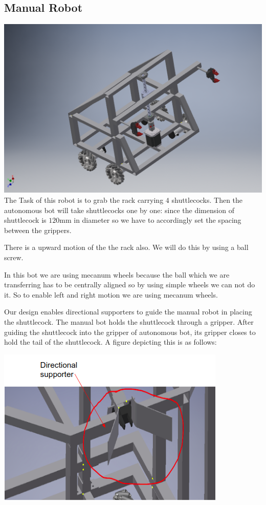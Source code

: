 \documentclass[11pt]{article}
\begin{document}
\subsection{Manual Robot}
	\includegraphics[scale=0.4]{manual.png}
	The Task of this robot is to grab the rack carrying $4$ shuttlecocks. Then the autonomous bot will take shuttlecocks one by one: since the dimension of shuttlecock is $120$mm in diameter so we have to accordingly set the spacing between the grippers.

	 There is a upward motion of the the rack also. We will do this by using a ball screw.
	
	In this bot we are using mecanum wheels because the ball which we are transferring has to be centrally aligned so by using simple wheels we can not do it. So to enable left and right motion we are using mecanum wheels.
    
Our design enables directional supporters to guide the manual robot in placing the shuttlecock. The manual bot holds the shuttlecock through a gripper. After guiding the shuttlecock into the gripper of autonomous bot, its gripper closes to hold the tail of the shuttlecock. A figure depicting this is as follows:

\includegraphics[scale=0.8]{transfer.png}
\end{document}

